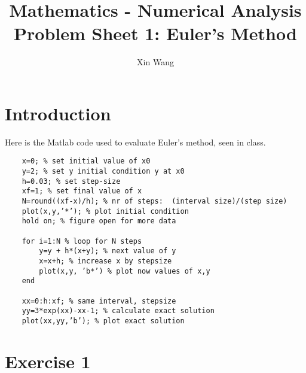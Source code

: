 \documentclass[10pt, a4paper]{article}
\begin{document}
\title{
    Mathematics - Numerical Analysis \\ \large Problem Sheet 1: Euler’s Method}
\author{Xin Wang}
\maketitle
\section{Introduction}
Here is the Matlab code used to evaluate Euler’s method, seen in class.
\begin{verbatim}
    x=0; % set initial value of x0
    y=2; % set y initial condition y at x0
    h=0.03; % set step-size
    xf=1; % set final value of x
    N=round((xf-x)/h); % nr of steps:  (interval size)/(step size)
    plot(x,y,’*’); % plot initial condition
    hold on; % figure open for more data

    for i=1:N % loop for N steps
        y=y + h*(x+y); % next value of y
        x=x+h; % increase x by stepsize
        plot(x,y, ’b*’) % plot now values of x,y
    end

    xx=0:h:xf; % same interval, stepsize
    yy=3*exp(xx)-xx-1; % calculate exact solution
    plot(xx,yy,’b’); % plot exact solution
\end{verbatim}   
    

\section{Exercise 1}
\end{document}

